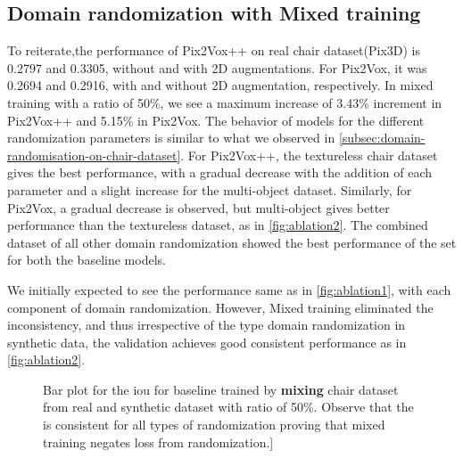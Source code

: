 \subsection{Domain randomization with Mixed training}\label{subsec:domain-randomisation-with-mixed-training}

To reiterate,the performance of Pix2Vox++ on real chair dataset(Pix3D) is 0.2797 and 0.3305, without and with 2D augmentations.
For Pix2Vox, it was 0.2694 and 0.2916, with and without 2D augmentation, respectively.
In mixed training with a ratio of 50\%, we see a maximum increase of 3.43\% increment in Pix2Vox++ and 5.15\% in Pix2Vox.
The behavior of models for the different randomization parameters is similar to what we observed in \autoref{subsec:domain-randomisation-on-chair-dataset}.
For Pix2Vox++, the textureless chair dataset gives the best performance, with a gradual decrease with the addition of each parameter and a slight increase for the multi-object dataset.
Similarly, for Pix2Vox, a gradual decrease is observed, but multi-object gives better performance than the textureless dataset, as in \autoref{fig:ablation2}.
The combined dataset of all other domain randomization showed the best performance of the set for both the baseline models.

We initially expected to see the performance same as in \autoref{fig:ablation1}, with each component of domain randomization.
However, Mixed training eliminated the inconsistency, and thus irrespective of the type domain randomization in synthetic data, the validation achieves good consistent performance as in \autoref{fig:ablation2}.

\begin{figure}[ht]
    \centering
    \resizebox{0.75\textwidth}{!}{}
    \caption{Bar plot for the \gls{iou}  for baseline trained by \textbf{mixing} chair dataset from real and synthetic dataset with ratio of 50\%.
    Observe that the  is consistent for all types of randomization proving that mixed training negates loss from randomization.]}
    \label{fig:ablation2}
\end{figure}


